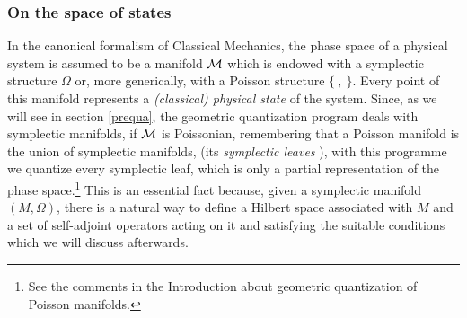 \documentclass[12pt]{article}
\theoremstyle{plain}
\begin{document}
\subsubsection{On the space of states}


In the canonical formalism of Classical Mechanics,
the phase space of a physical system is assumed to be a manifold ${\cal
M}$
which is endowed with a symplectic structure $\Omega$
or, more generically, with a Poisson structure $\{\ ,\ \}$.
Every point of this manifold represents a {\it (classical) physical
state} of the system.
Since, as we will see in section \ref{prequa},
the geometric quantization program deals with symplectic manifolds,
if ${\cal M}$ is Poissonian,
remembering that a Poisson manifold is the union of symplectic
manifolds,
(its {\it symplectic leaves} \cite{LM-87}), with this programme
we quantize every symplectic leaf, which is only a partial
representation of the phase space.\footnote{
See the comments in the Introduction about
geometric quantization of Poisson manifolds.
}
This is an essential fact because, given a symplectic manifold
$(M,\Omega )$,
there is a natural way to define a Hilbert space associated with $M$
and a set of self-adjoint operators acting on it and satisfying
the suitable conditions which we will discuss afterwards.
\end{document}
